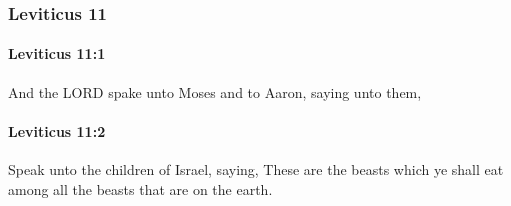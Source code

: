 	\subsubsection{Leviticus 11} %
		\label{LEVITICUS-11}

		\paragraph{Leviticus 11:1} %
			\label{LEVITICUS-11-1}

			And the LORD spake unto Moses and to Aaron, saying unto them,


		\paragraph{Leviticus 11:2} %
			\label{LEVITICUS-11-2}

			Speak unto the children of Israel, saying, These are the beasts which ye shall eat among all the beasts that are on the earth.

